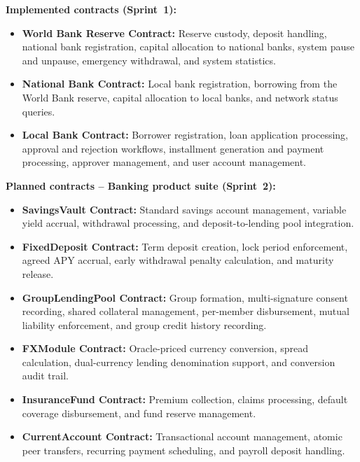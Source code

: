\documentclass[12pt,a4paper]{report}
\begin{document}
\textbf{Implemented contracts (Sprint~1):}
\begin{itemize}[noitemsep]
\item \textbf{World Bank Reserve Contract:} Reserve custody, deposit handling, national bank registration, capital allocation to national banks, system pause and unpause, emergency withdrawal, and system statistics.
\item \textbf{National Bank Contract:} Local bank registration, borrowing from the World Bank reserve, capital allocation to local banks, and network status queries.
\item \textbf{Local Bank Contract:} Borrower registration, loan application processing, approval and rejection workflows, installment generation and payment processing, approver management, and user account management.
\end{itemize}

\textbf{Planned contracts -- Banking product suite (Sprint~2):}
\begin{itemize}[noitemsep]
\item \textbf{SavingsVault Contract:} Standard savings account management, variable yield accrual, withdrawal processing, and deposit-to-lending pool integration.
\item \textbf{FixedDeposit Contract:} Term deposit creation, lock period enforcement, agreed APY accrual, early withdrawal penalty calculation, and maturity release.
\item \textbf{GroupLendingPool Contract:} Group formation, multi-signature consent recording, shared collateral management, per-member disbursement, mutual liability enforcement, and group credit history recording.
\item \textbf{FXModule Contract:} Oracle-priced currency conversion, spread calculation, dual-currency lending denomination support, and conversion audit trail.
\item \textbf{InsuranceFund Contract:} Premium collection, claims processing, default coverage disbursement, and fund reserve management.
\item \textbf{CurrentAccount Contract:} Transactional account management, atomic peer transfers, recurring payment scheduling, and payroll deposit handling.
\end{itemize}
\end{document}
